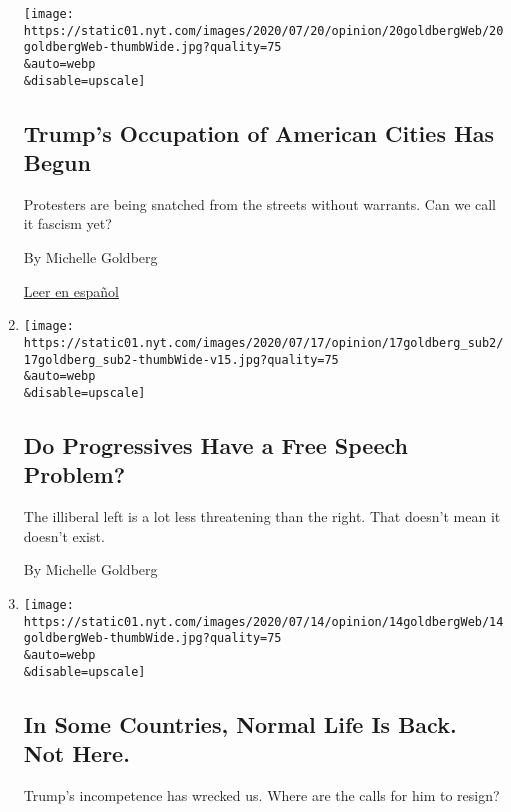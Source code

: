 \begin{enumerate}
  \texttt{[image: https://static01.nyt.com/images/2020/07/20/opinion/20goldbergWeb/20goldbergWeb-thumbWide.jpg?quality=75\\\&auto=webp\\\&disable=upscale]}

  \hypertarget{trumps-occupation-of-american-cities-has-begun}{%
  \subsection{Trump's Occupation of American Cities Has
  Begun}\label{trumps-occupation-of-american-cities-has-begun}}

  Protesters are being snatched from the streets without warrants. Can
  we call it fascism yet?

  By Michelle Goldberg

  \href{https://www.nytimes.com/es/2020/07/22/espanol/opinion/portland-protestas-trump.html}{Leer
  en español}
\item
  \href{/2020/07/17/opinion/sunday/harpers-letter-free-speech.html}{}

  \texttt{[image: https://static01.nyt.com/images/2020/07/17/opinion/17goldberg\_sub2/17goldberg\_sub2-thumbWide-v15.jpg?quality=75\\\&auto=webp\\\&disable=upscale]}

  \hypertarget{do-progressives-have-a-free-speech-problem}{%
  \subsection{Do Progressives Have a Free Speech
  Problem?}\label{do-progressives-have-a-free-speech-problem}}

  The illiberal left is a lot less threatening than the right. That
  doesn't mean it doesn't exist.

  By Michelle Goldberg
\item
  \href{/2020/07/13/opinion/us-coronavirus-trump.html}{}

  \texttt{[image: https://static01.nyt.com/images/2020/07/14/opinion/14goldbergWeb/14goldbergWeb-thumbWide.jpg?quality=75\\\&auto=webp\\\&disable=upscale]}

  \hypertarget{in-some-countries-normal-life-is-back-not-here}{%
  \subsection{In Some Countries, Normal Life Is Back. Not
  Here.}\label{in-some-countries-normal-life-is-back-not-here}}

  Trump's incompetence has wrecked us. Where are the calls for him to
  resign?


\end{enumerate}
